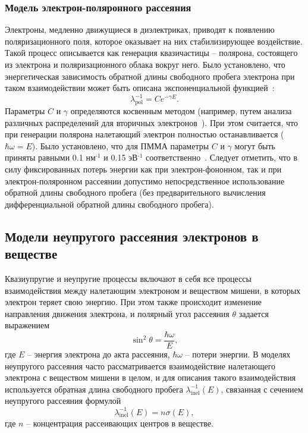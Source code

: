 \subsubsection{Модель электрон-поляронного рассеяния}
Электроны, медленно движущиеся в диэлектриках, приводят к появлению поляризационного поля, которое оказывает на них стабилизирующее воздействие. Такой процесс описывается как генерация квазичастицы – полярона, состоящего из электрона и поляризационного облака вокруг него. Было установлено, что энергетическая зависимость обратной длины свободного пробега электрона при таком взаимодействии может быть описана экспоненциальной функцией~\cite{Ganachaud_phonons_polarons}:
\begin{equation}
	\lambda_\mathrm{pol}^{-1}=C e^{-\gamma E}.
\end{equation}
Параметры $C$ и $\gamma$ определяются косвенным методом (например, путем анализа различных распределений для вторичных электронов~\cite{Ciappa_2010, Dapor2011}). При этом считается, что при генерации полярона налетающий электрон полностью останавливается ($\hbar \omega = E$). Было установлено, что для ПММА параметры $C$ и $\gamma$ могут быть приняты равными 0.1 нм$^\text{-1}$ и 0.15 эВ$^\text{-1}$ соответственно~\cite{Dapor_large_book}. Следует отметить, что в силу фиксированных потерь энергии как при электрон-фононном, так и при электрон-поляронном рассеянии допустимо непосредственное использование обратной длины свободного пробега (без предварительного вычисления дифференциальной обратной длины свободного пробега).


\subsection{Модели неупругого рассеяния электронов в веществе}
Квазиупругие и неупругие процессы включают в себя все процессы взаимодействия между налетающим электроном и веществом мишени, в которых электрон теряет свою энергию. При этом также происходит изменение направления движения электрона, и полярный угол рассеяния $\theta$ задается выражением~\cite{Ciappa_2010}
\begin{equation}
	\sin ^2 \theta=\frac{\hbar \omega}{E},
\end{equation}
где $E$ -- энергия электрона до акта рассеяния, $\hbar \omega$ -- потери энергии. В моделях неупругого рассеяния часто рассматривается взаимодействие налетающего электрона с веществом мишени в целом, и для описания такого взаимодействия используется обратная длина свободного пробега $\lambda_\mathrm{inel}^{-1}(E)$, связанная с сечением неупругого рассеяния формулой
\begin{equation}
	\lambda_{\text{inel}}^{-1}(E) = n \sigma(E),
\end{equation}
где $n$ -- концентрация рассеивающих центров в веществе.


